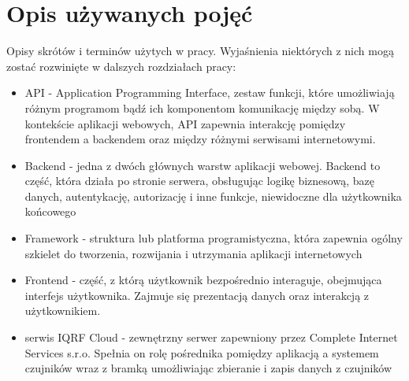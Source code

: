 \section{Opis używanych pojęć}

Opisy skrótów i terminów użytych w pracy. Wyjaśnienia niektórych z nich mogą zostać rozwinięte w dalszych
rozdziałach pracy:
\begin{itemize}
    \item API - Application Programming Interface, zestaw funkcji, które umożliwiają różnym 
    programom bądź ich komponentom komunikację między sobą. W kontekście aplikacji webowych, API zapewnia 
    interakcję pomiędzy frontendem a backendem oraz między różnymi serwisami internetowymi.
    \item Backend - jedna z dwóch głównych warstw aplikacji webowej. Backend to część, która 
    działa po stronie serwera, obsługując logikę biznesową, bazę danych, autentykację, autorizację i inne funkcje, 
    niewidoczne dla użytkownika końcowego
    \item Framework - struktura lub platforma programistyczna, która 
    zapewnia ogólny szkielet do tworzenia, rozwijania i utrzymania aplikacji internetowych
    \item Frontend - część, z którą użytkownik bezpośrednio interaguje, obejmująca interfejs użytkownika.
    Zajmuje się prezentacją danych oraz interakcją z użytkownikiem.
    \item serwis IQRF Cloud - zewnętrzny serwer zapewniony przez Complete Internet Services s.r.o. Spełnia on 
rolę pośrednika pomiędzy aplikacją a systemem czujników wraz z bramką umożliwiając zbieranie i zapis danych z czujników \cite{iqrf-cloud}
    
\end{itemize}